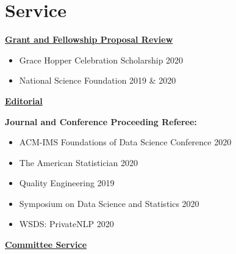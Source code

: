 \documentclass[11pt, letterpaper, roman]{moderncv} %
\begin{document}
\section{Service}

\underline{\textbf{\large Grant and Fellowship Proposal Review}}\normalsize

\vspace{4pt}
\begin{itemize}
    \item Grace Hopper Celebration Scholarship 2020
    \item National Science Foundation 2019 \& 2020
\end{itemize}

\vspace{4pt}
\underline{\textbf{\large Editorial}}\normalsize

\textbf{Journal and Conference Proceeding Referee:} 
    \begin{itemize}
        \item ACM-IMS Foundations of Data Science Conference 2020
        \item The American Statistician 2020
        \item Quality Engineering 2019
        \item Symposium on Data Science and Statistics 2020
        \item WSDS: PrivateNLP 2020
    \end{itemize}

\vspace{6pt}
\underline{\textbf{\large Committee Service}}\normalsize

\vspace{2pt}

\vspace{2pt}
\end{document}
